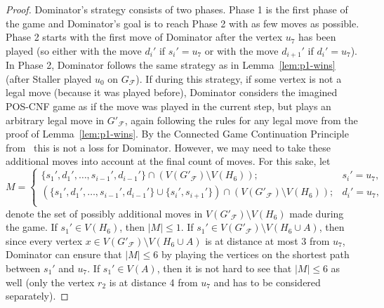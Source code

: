 \documentclass[12pt]{article}
\newcommand{\F}{\mathcal{F}}
\begin{document}
\begin{proof}
	Dominator's strategy consists of two phases. Phase 1 is the first phase of the game and Dominator's goal is to reach Phase 2 with as few moves as possible. Phase 2 starts with the first move of Dominator after the vertex $u_7$ has been played (so either with the move $d_i'$ if $s_i' = u_7$ or with the move $d_{i+1}'$ if $d_i' = u_7$). In Phase 2, Dominator follows the same strategy as in Lemma~\ref{lem:p1-wins} (after Staller played $u_0$ on $G_\F$). If during this strategy, if some vertex is not a legal move (because it was played before), Dominator considers the imagined POS-CNF game as if the move was played in the current step, but plays an arbitrary legal move in $G'_\F$, again following the rules for any legal move from the proof of Lemma~\ref{lem:p1-wins}. By the Connected Game Continuation Principle from~\cite{bujtas+2021connected} this is not a loss for Dominator. However, we may need to take these additional moves into account at the final count of moves. For this sake, let $$M = \begin{cases}
	 \{ s_1', d_1', \ldots, s_{i-1}', d_{i-1}' \} \cap \left( V(G'_\F) \setminus V(H_6) \right); & s_i' = u_7,\\
		\left( \{ s_1', d_1', \ldots, s_{i-1}', d_{i-1}' \} \cup \{ s_i', s_{i+1}' \} \right) \cap \left( V(G'_\F) \setminus V(H_6) \right); & d_i' = u_7,\\
	\end{cases}$$
	denote the set of possibly additional moves in $V(G'_{\F}) \setminus V(H_6)$ made during the game.
	If $s_1' \in V(H_6)$, then $|M| \leq 1$. If $s_1' \in V(G'_{\F}) \setminus V(H_6 \cup A)$, then since every vertex $x \in  V(G'_{\F}) \setminus V(H_6 \cup A)$ is at distance at most 3 from $u_7$, Dominator can ensure that $|M| \leq 6$ by playing the vertices on the shortest path between $s_1'$ and $u_7$. If $s_1' \in V(A)$, then it is not hard to see that $|M| \leq 6$ as well (only the vertex $r_2$ is at distance 4 from $u_7$ and has to be considered separately).
	

\end{proof}
\end{document}

